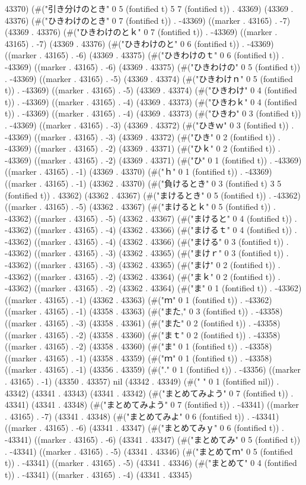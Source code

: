 43370) (#("引き分けのとき" 0 5 (fontified t) 5 7 (fontified t)) . 43369) (43369 . 43376) (#("ひきわけのとき" 0 7 (fontified t)) . -43369) ((marker . 43165) . -7) (43369 . 43376) (#("ひきわけのとｋ" 0 7 (fontified t)) . -43369) ((marker . 43165) . -7) (43369 . 43376) (#("ひきわけのと" 0 6 (fontified t)) . -43369) ((marker . 43165) . -6) (43369 . 43375) (#("ひきわけのｔ" 0 6 (fontified t)) . -43369) ((marker . 43165) . -6) (43369 . 43375) (#("ひきわけの" 0 5 (fontified t)) . -43369) ((marker . 43165) . -5) (43369 . 43374) (#("ひきわけｎ" 0 5 (fontified t)) . -43369) ((marker . 43165) . -5) (43369 . 43374) (#("ひきわけ" 0 4 (fontified t)) . -43369) ((marker . 43165) . -4) (43369 . 43373) (#("ひきわｋ" 0 4 (fontified t)) . -43369) ((marker . 43165) . -4) (43369 . 43373) (#("ひきわ" 0 3 (fontified t)) . -43369) ((marker . 43165) . -3) (43369 . 43372) (#("ひきｗ" 0 3 (fontified t)) . -43369) ((marker . 43165) . -3) (43369 . 43372) (#("ひき" 0 2 (fontified t)) . -43369) ((marker . 43165) . -2) (43369 . 43371) (#("ひｋ" 0 2 (fontified t)) . -43369) ((marker . 43165) . -2) (43369 . 43371) (#("ひ" 0 1 (fontified t)) . -43369) ((marker . 43165) . -1) (43369 . 43370) (#("ｈ" 0 1 (fontified t)) . -43369) ((marker . 43165) . -1) (43362 . 43370) (#("負けるとき" 0 3 (fontified t) 3 5 (fontified t)) . 43362) (43362 . 43367) (#("まけるとき" 0 5 (fontified t)) . -43362) ((marker . 43165) . -5) (43362 . 43367) (#("まけるとｋ" 0 5 (fontified t)) . -43362) ((marker . 43165) . -5) (43362 . 43367) (#("まけると" 0 4 (fontified t)) . -43362) ((marker . 43165) . -4) (43362 . 43366) (#("まけるｔ" 0 4 (fontified t)) . -43362) ((marker . 43165) . -4) (43362 . 43366) (#("まける" 0 3 (fontified t)) . -43362) ((marker . 43165) . -3) (43362 . 43365) (#("まけｒ" 0 3 (fontified t)) . -43362) ((marker . 43165) . -3) (43362 . 43365) (#("まけ" 0 2 (fontified t)) . -43362) ((marker . 43165) . -2) (43362 . 43364) (#("まｋ" 0 2 (fontified t)) . -43362) ((marker . 43165) . -2) (43362 . 43364) (#("ま" 0 1 (fontified t)) . -43362) ((marker . 43165) . -1) (43362 . 43363) (#("ｍ" 0 1 (fontified t)) . -43362) ((marker . 43165) . -1) (43358 . 43363) (#("また," 0 3 (fontified t)) . -43358) ((marker . 43165) . -3) (43358 . 43361) (#("また" 0 2 (fontified t)) . -43358) ((marker . 43165) . -2) (43358 . 43360) (#("まｔ" 0 2 (fontified t)) . -43358) ((marker . 43165) . -2) (43358 . 43360) (#("ま" 0 1 (fontified t)) . -43358) ((marker . 43165) . -1) (43358 . 43359) (#("ｍ" 0 1 (fontified t)) . -43358) ((marker . 43165) . -1) (43356 . 43359) (#("." 0 1 (fontified t)) . -43356) ((marker . 43165) . -1) (43350 . 43357) nil (43342 . 43349) (#("	" 0 1 (fontified nil)) . 43342) (43341 . 43343) (43341 . 43342) (#("まとめてみよう" 0 7 (fontified t)) . 43341) (43341 . 43348) (#("まとめてみよう" 0 7 (fontified t)) . -43341) ((marker . 43165) . -7) (43341 . 43348) (#("まとめてみよ" 0 6 (fontified t)) . -43341) ((marker . 43165) . -6) (43341 . 43347) (#("まとめてみｙ" 0 6 (fontified t)) . -43341) ((marker . 43165) . -6) (43341 . 43347) (#("まとめてみ" 0 5 (fontified t)) . -43341) ((marker . 43165) . -5) (43341 . 43346) (#("まとめてｍ" 0 5 (fontified t)) . -43341) ((marker . 43165) . -5) (43341 . 43346) (#("まとめて" 0 4 (fontified t)) . -43341) ((marker . 43165) . -4) (43341 . 43345) 